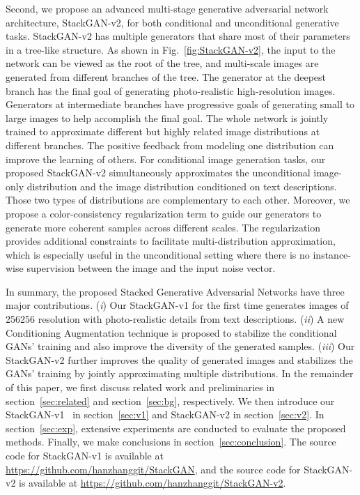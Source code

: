 \documentclass[10pt,journal,letterpaper,compsoc]{IEEEtran}
\begin{document}
{
Second, we propose an advanced multi-stage generative adversarial network architecture, StackGAN-v2, for both conditional and unconditional generative tasks. StackGAN-v2 has multiple generators that share most of their parameters in a tree-like structure. As shown in Fig.~\ref{fig:StackGAN-v2}, the input to the network can be viewed as the root of the tree, and multi-scale images are generated from different branches of the tree. The generator at the deepest branch has the final goal of generating photo-realistic high-resolution images. Generators at intermediate branches have progressive goals of generating small to large images to help accomplish the final goal. The whole network is jointly trained to approximate different but highly related image distributions at different branches. The positive feedback from modeling one distribution can improve the learning of others. For conditional image generation tasks, our proposed StackGAN-v2 simultaneously approximates the unconditional image-only distribution and the image distribution conditioned on text descriptions. Those two types of distributions are complementary to each other. Moreover, we propose a color-consistency regularization term to guide our generators to generate more coherent samples across different scales. The regularization provides additional constraints to facilitate multi-distribution approximation, which is especially useful in the unconditional setting where there is no instance-wise supervision between the image and the input noise vector. 
}


{
In summary, the proposed Stacked Generative Adversarial Networks have three major contributions. (\textit{i}) Our StackGAN-v1 for the first time generates images of 256256 resolution with photo-realistic details from text descriptions. (\textit{ii}) A new Conditioning Augmentation technique is proposed to stabilize the conditional GANs' training and also improve the diversity of the generated samples. (\textit{iii}) Our StackGAN-v2 further improves the quality of generated images and stabilizes the GANs' training by jointly approximating multiple distributions. In the remainder of this paper, we first discuss related work and preliminaries in section~\ref{sec:related} and section~\ref{sec:bg}, respectively. We then introduce our StackGAN-v1~\cite{Han16} in section~\ref{sec:v1} and StackGAN-v2 in section~\ref{sec:v2}. In section~\ref{sec:exp}, extensive experiments are conducted to evaluate the proposed methods. Finally, we make conclusions in section~\ref{sec:conclusion}. The source code for StackGAN-v1 is available at {\href{https://github.com/hanzhanggit/StackGAN}{https://github.com/hanzhanggit/StackGAN}}, and the source code for StackGAN-v2 is available at {\href{https://github.com/hanzhanggit/StackGAN-v2}{https://github.com/hanzhanggit/StackGAN-v2}}.
}
\end{document}
